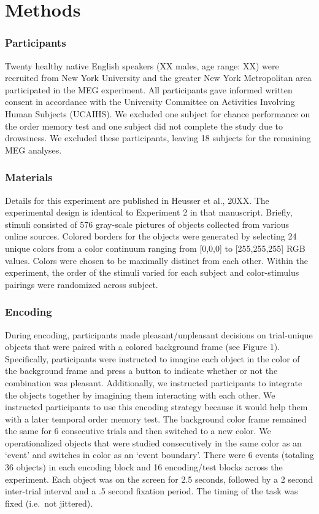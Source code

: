 \section{Methods}\label{methods}

\subsubsection{Participants}\label{participants}

Twenty healthy native English speakers (XX males, age range: XX) were
recruited from New York University and the greater New York Metropolitan
area participated in the MEG experiment. All participants gave informed
written consent in accordance with the University Committee on
Activities Involving Human Subjects (UCAIHS). We excluded one subject
for chance performance on the order memory test and one subject did not
complete the study due to drowsiness. We excluded these participants,
leaving 18 subjects for the remaining MEG analyses.

\subsubsection{Materials}\label{materials}

Details for this experiment are published in Heusser et al., 20XX. The
experimental design is identical to Experiment 2 in that manuscript.
Briefly, stimuli consisted of 576 gray-scale pictures of objects
collected from various online sources. Colored borders for the objects
were generated by selecting 24 unique colors from a color continuum
ranging from {[}0,0,0{]} to {[}255,255,255{]} RGB values. Colors were
chosen to be maximally distinct from each other. Within the experiment,
the order of the stimuli varied for each subject and color-stimulus
pairings were randomized across subject.

\subsubsection{Encoding}\label{encoding}

During encoding, participants made pleasant/unpleasant decisions on
trial-unique objects that were paired with a colored background frame
(see Figure 1). Specifically, participants were instructed to imagine
each object in the color of the background frame and press a button to
indicate whether or not the combination was pleasant. Additionally, we
instructed participants to integrate the objects together by imagining
them interacting with each other. We instructed participants to use this
encoding strategy because it would help them with a later temporal order
memory test. The background color frame remained the same for 6
consecutive trials and then switched to a new color. We operationalized
objects that were studied consecutively in the same color as an `event'
and switches in color as an `event boundary'. There were 6 events
(totaling 36 objects) in each encoding block and 16 encoding/test blocks
across the experiment. Each object was on the screen for 2.5 seconds,
followed by a 2 second inter-trial interval and a .5 second fixation
period. The timing of the task was fixed (i.e.~not jittered).

